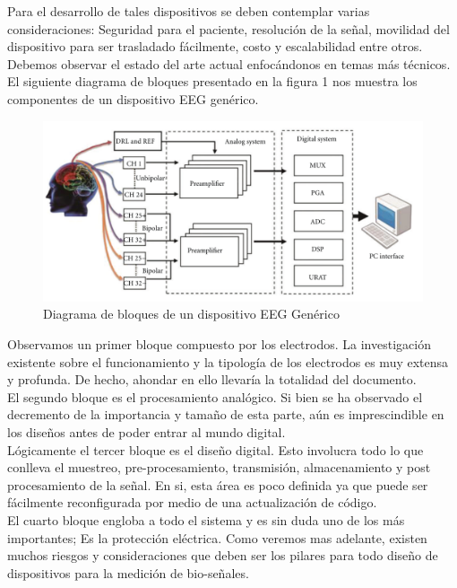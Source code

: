 Para el desarrollo de tales dispositivos se deben contemplar varias consideraciones: Seguridad para el paciente, resolución de la señal, movilidad del dispositivo para ser trasladado fácilmente, costo y escalabilidad entre otros. Debemos observar el estado del arte actual enfocándonos en temas más técnicos. El siguiente diagrama de bloques presentado en la figura 1 nos muestra los componentes de un dispositivo EEG genérico.\\

\begin{figure}[htbp]
\centering
\includegraphics[width=.9\linewidth]{./bloques_EEG.png}
\caption{\label{fig:bloques_eeg}Diagrama de bloques de un dispositivo EEG Genérico}
\end{figure}

Observamos un primer bloque compuesto por los electrodos. La investigación existente sobre el funcionamiento y la tipología de los electrodos es muy extensa y profunda. De hecho, ahondar en ello llevaría la totalidad del documento.\\

El segundo bloque es el procesamiento analógico. Si bien se ha observado el decremento de la importancia y tamaño de esta parte, aún es imprescindible en los diseños antes de poder entrar al mundo digital.\\

Lógicamente el tercer bloque es el diseño digital. Esto involucra todo lo que conlleva el muestreo, pre-procesamiento, transmisión, almacenamiento y post procesamiento de la señal. En si, esta área es poco definida ya que puede ser fácilmente reconfigurada por medio de una actualización de código.\\

El cuarto bloque engloba a todo el sistema y es sin duda uno de los más importantes; Es la protección eléctrica. Como veremos mas adelante, existen muchos riesgos y consideraciones que deben ser los pilares para todo diseño de dispositivos para la medición de bio-señales.\\

